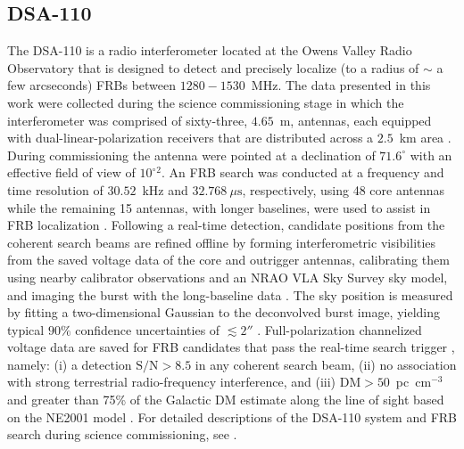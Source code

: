 \documentclass[twocolumn, linenumbers]{aastex701}
\begin{document}
\subsection{DSA-110} \label{sec:obs_dsa}
The DSA-110 is a radio interferometer located at the Owens Valley Radio Observatory that is designed to detect and precisely localize (to a radius of $\sim$ a few arcseconds) FRBs between $1280-1530$~MHz. The data presented in this work were collected during the science commissioning stage in which the interferometer was comprised of sixty-three, $4.65$~m, antennas, each equipped with dual-linear-polarization receivers that are distributed across a $2.5$~km area \citep{2024ApJ...967...29L}. During commissioning the antenna were pointed at a declination of $71.6^\circ$ with an effective field of view of $10^{\circ}{}^{2}$. An FRB search was conducted at a frequency and time resolution of $30.52$~kHz and $32.768~\mu\mathrm{s}$, respectively, using 48 core antennas while the remaining 15 antennas, with longer baselines, were used to assist in FRB localization \citep{Sherman_2024_ApJ}. Following a real-time detection, candidate positions from the coherent search beams are refined offline by forming interferometric visibilities from the saved voltage data of the core and outrigger antennas, calibrating them using nearby calibrator observations and an NRAO VLA Sky Survey sky model, and imaging the burst with the long-baseline data \citep{2023ApJ...949L...3R}. The sky position is measured by fitting a two-dimensional Gaussian to the deconvolved burst image, yielding typical $90\%$ confidence uncertainties of $\lesssim 2''$ \citep{2024ApJ...967...29L, 2023ApJ...949L...3R}. Full-polarization channelized voltage data are saved for FRB candidates that pass the real-time search trigger \citep{2024ApJ...967...29L}, namely: (i) a detection $\mathrm{S/N} > 8.5$ in any coherent search beam, (ii) no association with strong terrestrial radio-frequency interference, and (iii) $\mathrm{DM} > 50$~pc~cm$^{-3}$ and greater than 75\% of the Galactic DM estimate along the line of sight based on the NE2001 model \citet{2002astro.ph..7156C}. For detailed descriptions of the DSA-110 system and FRB search during science commissioning, see \citep{2023ApJ...949L...3R, 2024ApJ...967...29L}.
\end{document}
